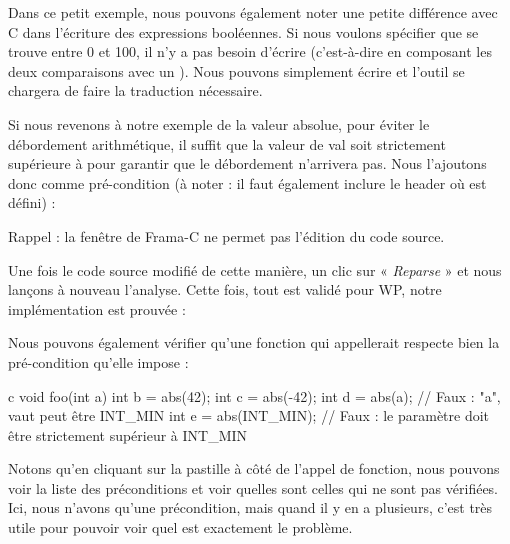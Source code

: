 Dans ce petit exemple, nous pouvons également noter une petite différence avec 
C dans l'écriture des expressions booléennes. Si nous voulons spécifier 
que  se trouve entre 0 et 100, il n'y a pas besoin d'écrire 
(c'est-à-dire en composant les deux comparaisons avec un \CodeInline{\&\&}). Nous 
pouvons simplement écrire  et l'outil se chargera de faire
la traduction nécessaire.



Si nous revenons à notre exemple de la valeur absolue, pour éviter le 
débordement arithmétique, il suffit que la valeur de val soit strictement 
supérieure à  pour garantir que le débordement n'arrivera pas.
Nous l'ajoutons donc comme pré-condition (à noter : il faut également
inclure le header où  est défini) :






\begin{Warning}
Rappel : la fenêtre de Frama-C ne permet pas l'édition du code source.
\end{Warning}


Une fois le code source modifié de cette manière, un clic sur « \textit{Reparse} » et 
nous lançons à nouveau l'analyse. Cette fois, tout est validé pour WP, notre 
implémentation est prouvée :





Nous pouvons également vérifier qu'une fonction qui appellerait  
respecte bien la pré-condition qu'elle impose :



\begin{CodeBlock}{c}
void foo(int a){
   int b = abs(42);
   int c = abs(-42);
   int d = abs(a);       // Faux : "a", vaut peut être INT_MIN
   int e = abs(INT_MIN); // Faux : le paramètre doit être strictement supérieur à INT_MIN
}
\end{CodeBlock}




Notons qu'en cliquant sur la pastille à côté de l'appel de fonction, nous
pouvons voir la liste des préconditions et voir quelles sont celles qui ne sont
pas vérifiées. Ici, nous n'avons qu'une précondition, mais quand il y en a
plusieurs, c'est très utile pour pouvoir voir quel est exactement le problème.


